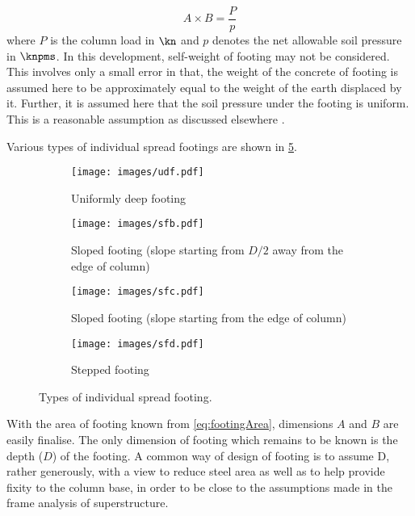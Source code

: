 \begin{equation}
\label{eq:footingArea}
A \times B = \frac{P}{p}
\end{equation}
where $P$ is the column load in $\kn$ and $p$ denotes the net allowable
soil pressure in $\knpms$. In this development, self-weight of footing
may not be considered. This involves only a small error in that, the
weight of the concrete of footing is assumed here to be approximately
equal to the weight of the earth displaced by it. Further, it is assumed
here that the soil pressure under the footing is uniform. This is a 
reasonable assumption as discussed elsewhere \cite{ferguson1973reinforced}. 

Various types of individual spread footings are shown in
\fig \ref{Types-of-individual-spread-footing}.
\begin{figure}
\begin{subfigure}[b]{0.5\textwidth}
  \texttt{[image: images/udf.pdf]}
    \caption{Uniformly deep footing}
    \label{uniformdeepfooting}
  \end{subfigure}
  \begin{subfigure}[b]{0.5\textwidth}
    \texttt{[image: images/sfb.pdf]}
    \caption{Sloped footing (slope starting from $D/2$ away from the
     edge of column)}
    \label{Slopedfooting}
  \end{subfigure}
 \begin{subfigure}[b]{0.5\textwidth}
    \texttt{[image: images/sfc.pdf]}
    \caption{Sloped footing (slope starting from the edge of column)}
    \label{slopefooting}
  \end{subfigure}
\begin{subfigure}[b]{0.5\textwidth}
    \texttt{[image: images/sfd.pdf]}
    \caption{Stepped footing}
    \label{steppedfooting}
  \end{subfigure}
\caption{Types of individual spread footing.}
\label{Types-of-individual-spread-footing}
\end{figure}
With the area of footing known from \eqn \ref{eq:footingArea},
dimensions $A$ and $B$ are easily finalise.  The only dimension of 
footing which remains to be known is the depth ($D$) of the footing.  
A common way of design of footing is to assume D, rather generously,
with a view to reduce steel area as well as to help provide fixity to
the column base, in order to be close to the assumptions made in the
frame analysis of superstructure.

